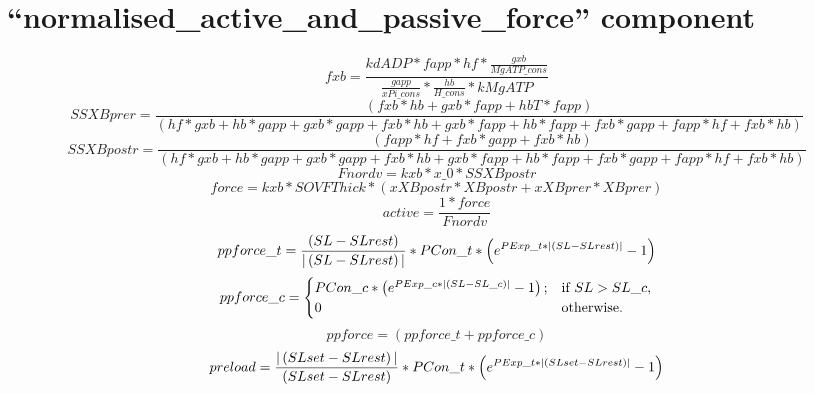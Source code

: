\documentclass[10pt,landscape]{article}
\begin{document}
\section{``normalised\_active\_and\_passive\_force'' component}
\textbf{}
\begin{displaymath}fxb = \frac{kdADP \ast fapp \ast hf \ast \frac{gxb}{MgATP\_cons}}{\frac{gapp}{xPi\_cons} \ast \frac{hb}{H\_cons} \ast kMgATP}
\end{displaymath}
\textbf{}
\begin{displaymath}SSXBprer = \frac{\left(fxb \ast hb+gxb \ast fapp+hbT \ast fapp\right)}{\left(hf \ast gxb+hb \ast gapp+gxb \ast gapp+fxb \ast hb+gxb \ast fapp+hb \ast fapp+fxb \ast gapp+fapp \ast hf+fxb \ast hb\right)}
\end{displaymath}
\textbf{}
\begin{displaymath}SSXBpostr = \frac{\left(fapp \ast hf+fxb \ast gapp+fxb \ast hb\right)}{\left(hf \ast gxb+hb \ast gapp+gxb \ast gapp+fxb \ast hb+gxb \ast fapp+hb \ast fapp+fxb \ast gapp+fapp \ast hf+fxb \ast hb\right)}
\end{displaymath}
\textbf{}
\begin{displaymath}Fnordv = kxb \ast x\_0 \ast SSXBpostr
\end{displaymath}
\textbf{}
\begin{displaymath}force = kxb \ast SOVFThick \ast \left(xXBpostr \ast XBpostr+xXBprer \ast XBprer\right)
\end{displaymath}
\textbf{}
\begin{displaymath}active = \frac{1 \ast force}{Fnordv}
\end{displaymath}
\textbf{}
\begin{displaymath}ppforce\_t = \frac{\left(SL-SLrest\right)}{\arrowvert\left(SL-SLrest\right)\arrowvert} \ast PCon\_t \ast \left(e^{PExp\_t \ast \arrowvert\left(SL-SLrest\right)\arrowvert}-1\right)
\end{displaymath}
\textbf{}
\begin{displaymath}ppforce\_c = 
\begin{cases}PCon\_c \ast \left(e^{PExp\_c \ast \arrowvert\left(SL-SL\_c\right)\arrowvert}-1\right);
        &  \text{if }SL > SL\_c,\\0&  \text{otherwise}.
\end{cases}
\end{displaymath}
\textbf{}
\begin{displaymath}ppforce = \left(ppforce\_t+ppforce\_c\right)
\end{displaymath}
\textbf{}
\begin{displaymath}preload = \frac{\arrowvert\left(SLset-SLrest\right)\arrowvert}{\left(SLset-SLrest\right)} \ast PCon\_t \ast \left(e^{PExp\_t \ast \arrowvert\left(SLset-SLrest\right)\arrowvert}-1\right)
\end{displaymath}
\end{document}
